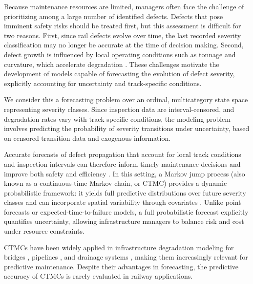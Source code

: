 Because maintenance resources are limited, managers often face the challenge of prioritizing among a large number of identified defects. 
Defects that pose imminent safety risks should be treated first, but this assessment is difficult for two reasons. 
First, since rail defects evolve over time, the last recorded severity classification may no longer be accurate at the time of decision making. 
Second, defect growth is influenced by local operating conditions such as tonnage and curvature, which accelerate degradation \citep{bai2017a,Kumar2008HolisticSweden}.
These challenges motivate the development of models capable of forecasting the evolution of defect severity, explicitly accounting for uncertainty and track-specific conditions.


We consider this a forecasting problem over an ordinal, multicategory state space representing severity classes. Since inspection data are interval-censored, and degradation rates vary with track-specific conditions, the modeling problem involves predicting the probability of severity transitions under uncertainty, based on censored transition data and exogenous information.

Accurate forecasts of defect propagation that account for local track conditions and inspection intervals can therefore inform timely maintenance decisions and improve both safety and efficiency \citep{Binder2023}. In this setting, a Markov jump process (also known as a continuous-time Markov chain, or CTMC) provides a dynamic probabilistic framework: it yields full predictive distributions over future severity classes and can incorporate spatial variability through covariates \citep{bisgaard2024A}. Unlike point forecasts or expected-time-to-failure models, a full probabilistic forecast explicitly quantifies uncertainty, allowing infrastructure managers to balance risk and cost under resource constraints.

CTMCs have been widely applied in infrastructure degradation modeling for bridges \citep{Mizutani2023RegimeSwitching}, pipelines \citep{JimenezRoa2024Nonhomogeneous}, and drainage systems \citep{Wu2021ConditionPrediction}, making them increasingly relevant for predictive maintenance. Despite their advantages in forecasting, the predictive accuracy of CTMCs is rarely evaluated in railway applications. 

